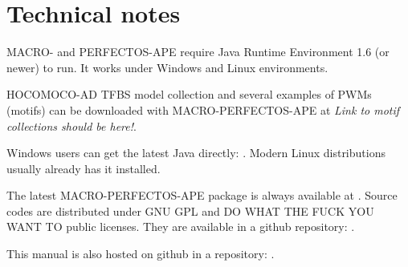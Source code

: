 \section{Technical notes}
MACRO- and PERFECTOS-APE require Java Runtime Environment 1.6 (or newer) to run. It works under Windows and Linux 
environments. 

HOCOMOCO-AD  TFBS model collection and several examples of PWMs (motifs) can be downloaded with MACRO-PERFECTOS-APE at \emph{Link to motif collections should be here!}.

Windows users can get the latest Java directly: . 
Modern Linux distributions usually already has it installed.

The latest MACRO-PERFECTOS-APE package is always available at . Source codes are distributed under GNU GPL and DO WHAT THE FUCK YOU WANT TO public licenses. They are available in a github repository: .

This manual is also hosted on github in a repository: .
